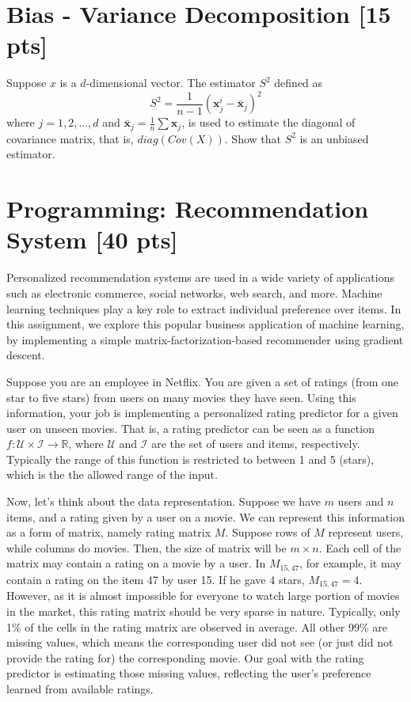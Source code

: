 \documentclass[twoside,10pt]{article}
\begin{document}
\vspace{1cm}

\section{Bias - Variance Decomposition [15 pts]}

Suppose $x$ is a $d$-dimensional vector. The estimator $S^2$ defined as
$$ S^2 = \frac{1}{n-1} (\textbf{x}_j^i - \bar{\textbf{x}}_j)^2 $$
where $j = 1, 2, ..., d$ and $\bar{\textbf{x}}_j = \frac{1}{n} \sum \textbf{x}_j$, is used to estimate the diagonal of covariance matrix, that is, $diag(Cov(X))$. Show that $S^2$ is an unbiased estimator.

\vspace{1cm}

\section{Programming: Recommendation System [40 pts]}

Personalized recommendation systems are used in a wide variety of
applications such as electronic commerce, social networks, web
search, and more. Machine learning techniques play a key role to
extract individual preference over items. In this assignment, we
explore this popular business application of machine learning, by
implementing a simple matrix-factorization-based recommender using
gradient descent.

Suppose you are an employee in Netflix. You are given a set of
ratings (from one star to five stars) from users on many movies they
have seen. Using this information, your job is implementing a
personalized rating predictor for a given user on unseen movies.
That is, a rating predictor can be seen as a function $f:
\mathcal{U} \times \mathcal{I} \rightarrow \mathbb{R}$, where
$\mathcal{U}$ and $\mathcal{I}$ are the set of users and items,
respectively. Typically the range of this function is restricted to
between 1 and 5 (stars), which is the the allowed range of the
input.

Now, let's think about the data representation. Suppose we have $m$
users and $n$ items, and a rating given by a user on a movie. We can
represent this information as a form of matrix, namely rating matrix
$M$. Suppose rows of $M$ represent users, while columns do movies.
Then, the size of matrix will be $m \times n$. Each cell of the
matrix may contain a rating on a movie by a user. In $M_{15,47}$,
for example, it may contain a rating on the item 47 by user 15. If
he gave 4 stars, $M_{15,47} = 4$. However, as it is almost
impossible for everyone to watch large portion of movies in the
market, this rating matrix should be very sparse in nature.
Typically, only 1\% of the cells in the rating matrix are observed
in average. All other 99\% are missing values, which means the
corresponding user did not see (or just did not provide the rating
for) the corresponding movie. Our goal with the rating predictor is
estimating those missing values, reflecting the user's preference
learned from available ratings.
\end{document}
